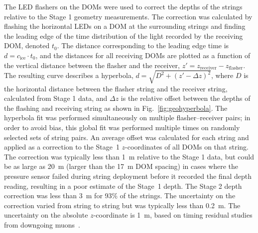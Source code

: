 The LED flashers on the DOMs were used to correct the depths of the strings relative to
the Stage 1 geometry measurements. The correction was calculated by flashing
the horizontal LEDs on a DOM at the surrounding strings and finding the
leading edge of the time distribution of the light recorded by the
receiving DOM, denoted $t_0$. The distance corresponding to the leading
edge time is $d = c_{\mathrm{ice}} \cdot t_0$, and the distances for all receiving
DOMs are plotted as a function of the vertical distance between the flasher
and the receiver, $z' = z_{\mathrm{receiver}} - z_{\mathrm{flasher}}$. The resulting curve
describes a hyperbola, $d = \sqrt{D^2 + (z' -\Delta z)^2}$, where $D$ is
the horizontal distance between the flasher string and the receiver string,
calculated from Stage 1 data, and $\Delta z$ is the relative offset between
the depths of the flashing and receiving string as shown in
Fig.~\ref{fig:geohyperbola}. The hyperbola fit was performed
simultaneously on multiple flasher--receiver pairs; in order to avoid
bias, this global fit was performed multiple times on randomly
selected sets of string pairs. An average offset was calculated for
each string and applied as a correction to the Stage~1 $z$-coordinates
of all DOMs on that string. The correction was typically less than 1~m
relative to the Stage 1 data, but could be as large as 20~m (larger than the
17~m DOM spacing) in cases where the pressure sensor failed during string
deployment before it recorded the final depth reading, resulting in a
poor estimate of the Stage~1 depth. The Stage 2 depth correction was less than 3~m for 93\%
of the strings. The uncertainty on the correction varied from string
to string but was typically less than 0.2~m. The uncertainty on the
absolute $z$-coordinate is 1~m, based on timing residual studies from
downgoing muons~\cite{IC3:perf}.

